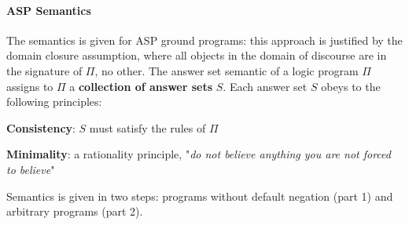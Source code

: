 \documentclass[10pt]{report}
\begin{document}
\paragraph{ASP Semantics} The semantics is given for ASP ground programs: this approach is justified by the domain closure assumption, where all objects in the domain of discourse are in the signature of $\Pi$, no other. The answer set semantic of a logic program $\Pi$ assigns to $\Pi$ a \textbf{collection of answer sets} $S$. Each answer set $S$ obeys to the following principles:\begin{list}{}{}
	\item \textbf{Consistency}: $S$ must satisfy the rules of $\Pi$
	\item \textbf{Minimality}: a rationality principle, "\textit{do not believe anything you are not forced to believe}"
\end{list}
Semantics is given in two steps: programs without default negation (part 1) and arbitrary programs (part 2).
\end{document}
